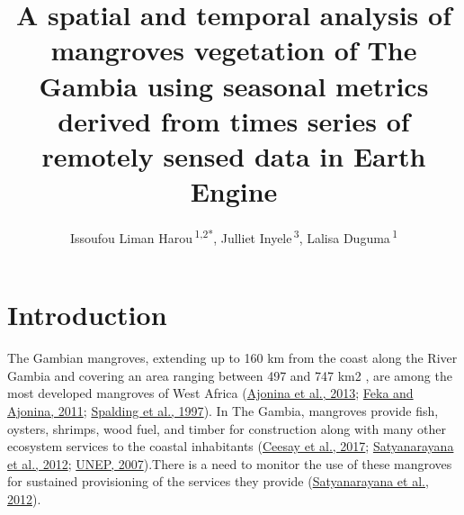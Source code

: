 \documentclass[utf8]{frontiersSCNS}
\def\Authors{
  Issoufou Liman Harou\,\textsuperscript{1,2*},
  Julliet Inyele\,\textsuperscript{3},
  Lalisa Duguma\,\textsuperscript{1}}
\def\firstAuthorLast{Liman Harou {et~al.}}
\begin{document}
\onecolumn
{}


\title[A spatial and temporal analysis of mangroves vegetation of The
Gambia]{A spatial and temporal analysis of mangroves vegetation of The
Gambia using seasonal metrics derived from times series of remotely
sensed data in Earth Engine}
\author[\firstAuthorLast]{\Authors}
\address{} %
\correspondance{} %

\extraAuth{}%


\maketitle

\hypertarget{introduction}{%
\section*{Introduction}\label{introduction}}

The Gambian mangroves, extending up to 160 km from the coast along the
River Gambia and covering an area ranging between 497 and 747 km2 , are
among the most developed mangroves of West Africa
(\protect\hyperlink{ref-Ajonina-et-al-2013}{Ajonina et al., 2013};
\protect\hyperlink{ref-Feka-and-Ajonina-2011}{Feka and Ajonina, 2011};
\protect\hyperlink{ref-Spalding-et-al-1997}{Spalding et al., 1997}). In
The Gambia, mangroves provide fish, oysters, shrimps, wood fuel, and
timber for construction along with many other ecosystem services to the
coastal inhabitants (\protect\hyperlink{ref-Ceesay-et-al-2017}{Ceesay et
al., 2017};
\protect\hyperlink{ref-Satyanarayana-et-al-2012}{Satyanarayana et al.,
2012}; \protect\hyperlink{ref-UNEP-2007}{UNEP, 2007}).There is a need to
monitor the use of these mangroves for sustained provisioning of the
services they provide
(\protect\hyperlink{ref-Satyanarayana-et-al-2012}{Satyanarayana et al.,
2012}).
\end{document}
